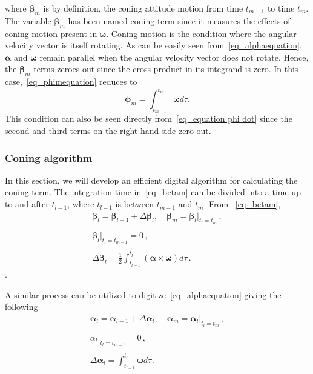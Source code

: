 \documentclass[journal]{IEEEtran}
\begin{document}
where $\boldsymbol{\beta}_m$ is by definition, the coning attitude motion from time $t_{m-1}$ to time $t_m$. The variable $\boldsymbol{\beta}_m$ has been named coning term since it measures the effects of coning motion present in $\boldsymbol{\omega}$. Coning motion is the condition where the angular velocity vector is itself rotating. As can be easily seen from~\eqref{eq_alphaequation}, $\boldsymbol{\alpha}$ and $\boldsymbol{\omega}$ remain parallel when the angular velocity vector does not rotate. Hence, the $\boldsymbol{\beta}_m$ terms zeroes out since the cross product in its integrand is zero. In this case,~\eqref{eq_phimequation} reduces to 
\begin{equation}
\boldsymbol{\phi}_m = \int_{t_{m-1}}^{t
_m}\boldsymbol{\boldsymbol{\omega}}d\tau.
\end{equation}
This condition can  also be seen directly from~\eqref{eq_equation phi dot} since the second and third terms on the right-hand-side zero out.


%
\subsubsection{Coning algorithm}
In this section, we will develop an efficient digital algorithm for calculating the coning term. The integration time in~\eqref{eq_betam} can be divided into a time up to and after $t_{l-1}$, where $t_{l-1}$ is between $t_{m-1}$ and $t_{m}$. From ~\eqref{eq_betam},
\begin{equation}\label{eq_betadigital}
\begin{array}{c}
\boldsymbol{\beta}_l = \boldsymbol{\beta}_{l-1}+\Delta\boldsymbol{\beta}_l, \quad   \boldsymbol{\beta}_m = \boldsymbol{\beta}_l\bigg\rvert_{t_l=t_m}\,,\\
\\
\boldsymbol{\beta}_l\bigg\rvert_{{t_l=t_{m-1}}} = 0\,,\\
\\
\Delta\boldsymbol{\beta}_l =\frac{1}{2} \int_{t_{l-1}}^{t_l}\left(\boldsymbol{\alpha}\times\boldsymbol{\omega}\right)d\tau\,.
\end{array}
\end{equation}.

A similar process can be utilized to digitize~\eqref{eq_alphaequation} giving the following
\begin{equation}\label{eq_alphadigital}
\begin{array}{c}
\boldsymbol{\alpha}_l = \boldsymbol{\alpha}_{l-1}+\Delta\boldsymbol{\alpha}_l, \quad  \boldsymbol{\alpha}_m = \boldsymbol{\alpha}_l\bigg\rvert_{t_l=t_m}\,,\\
\\
{\alpha}_l\bigg\rvert_{t_l=t_{m-1}} = 0\,,\\
\\
\Delta\boldsymbol{\alpha}_l = \int_{t_{l-1}}^{t_l}\boldsymbol{\omega}d\tau\,.
   \end{array}
\end{equation}
\end{document}
